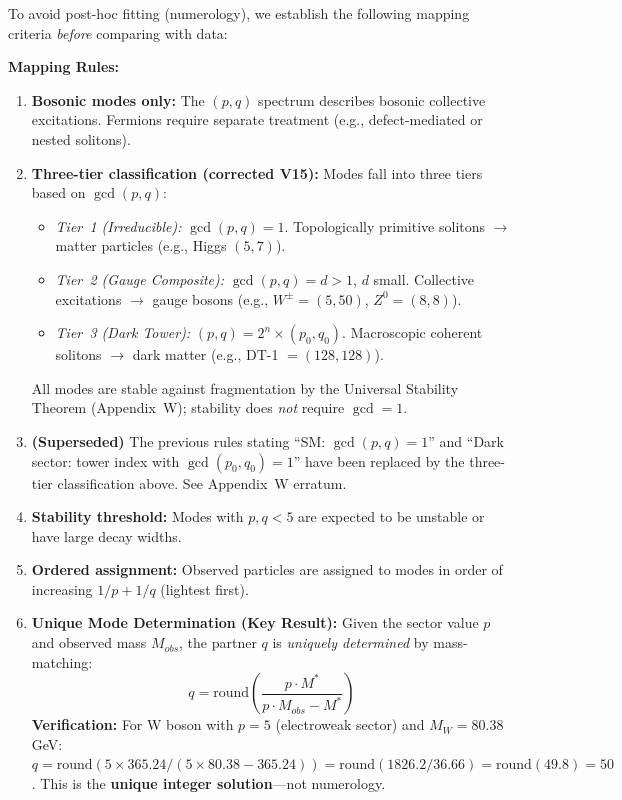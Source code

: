 \documentclass[a4paper,12pt]{article}
\begin{document}
To avoid post-hoc fitting (numerology), we establish the following mapping criteria \emph{before} comparing with data:

\textbf{Mapping Rules:}
\begin{enumerate}
\item \textbf{Bosonic modes only:} The $(p,q)$ spectrum describes bosonic collective excitations. Fermions require separate treatment (e.g., defect-mediated or nested solitons).
\item \textbf{Three-tier classification (corrected V15):} Modes fall into three tiers based on $\gcd(p,q)$:
  \begin{itemize}
  \item \emph{Tier~1 (Irreducible):} $\gcd(p,q) = 1$. Topologically primitive solitons $\to$ matter particles (e.g., Higgs $(5,7)$).
  \item \emph{Tier~2 (Gauge Composite):} $\gcd(p,q) = d > 1$, $d$ small. Collective excitations $\to$ gauge bosons (e.g., $W^\pm = (5,50)$, $Z^0 = (8,8)$).
  \item \emph{Tier~3 (Dark Tower):} $(p,q) = 2^n \times (p_0,q_0)$. Macroscopic coherent solitons $\to$ dark matter (e.g., DT-1 $= (128,128)$).
  \end{itemize}
  All modes are stable against fragmentation by the Universal Stability Theorem (Appendix~W); stability does \emph{not} require $\gcd = 1$.
\item \textbf{(Superseded)} The previous rules stating ``SM: $\gcd(p,q)=1$'' and ``Dark sector: tower index with $\gcd(p_0,q_0)=1$'' have been replaced by the three-tier classification above. See Appendix~W erratum.
\item \textbf{Stability threshold:} Modes with $p, q < 5$ are expected to be unstable or have large decay widths.
\item \textbf{Ordered assignment:} Observed particles are assigned to modes in order of increasing $1/p + 1/q$ (lightest first).
\item \textbf{Unique Mode Determination (Key Result):} Given the sector value $p$ and observed mass $M_{obs}$, the partner $q$ is \emph{uniquely determined} by mass-matching:
\begin{equation}
q = \mathrm{round}\left(\frac{p \cdot M^*}{p \cdot M_{obs} - M^*}\right)
\end{equation}
\textbf{Verification:} For W boson with $p = 5$ (electroweak sector) and $M_W = 80.38$ GeV:
$q = \mathrm{round}(5 \times 365.24 / (5 \times 80.38 - 365.24)) = \mathrm{round}(1826.2/36.66) = \mathrm{round}(49.8) = 50$. This is the \textbf{unique integer solution}---not numerology.
\end{enumerate}
\end{document}
